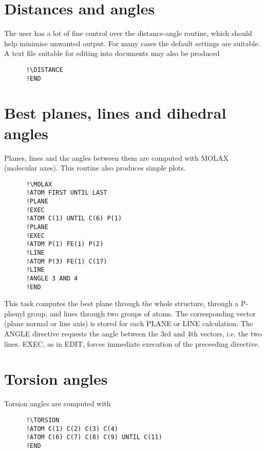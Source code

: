 \documentclass[10pt,a4paper]{report}
\begin{document}
\section{Distances and angles}


The user has a lot of fine control over the distance-angle routine, which
 should help minimise unwanted output. For many cases the default settings are
 suitable. A text file suitable for editing into documents may also be
 produced

\small\begin{verbatim}
      !\DISTANCE
      !END
\end{verbatim}\normalsize





\section{Best planes, lines and dihedral angles}


Planes, lines and the angles between them are computed with MOLAX (molecular
 axes). This routine also produces simple plots.

\small\begin{verbatim}
      !\MOLAX
      !ATOM FIRST UNTIL LAST
      !PLANE
      !EXEC
      !ATOM C(1) UNTIL C(6) P(1)
      !PLANE
      !EXEC
      !ATOM P(1) FE(1) P(2)
      !LINE
      !ATOM P(3) FE(1) C(17)
      !LINE
      !ANGLE 3 AND 4
      !END
\end{verbatim}\normalsize




This task computes the best plane through the whole structure, through a
 P-phenyl group, and lines through two groups of atoms. The corresponding
 vector (plane normal or line axis)
 is stored for each PLANE or LINE calculation. The ANGLE directive
 requests the angle between the 3rd and 4th vectors, i.e. the two lines.
 EXEC, as in EDIT, forces immediate execution of the preceeding directive.




\section{Torsion angles}


Torsion angles are computed with

\small\begin{verbatim}
      !\TORSION
      !ATOM C(1) C(2) C(3) C(4)
      !ATOM C(6) C(7) C(8) C(9) UNTIL C(11)
      !END
\end{verbatim}\normalsize
\end{document}
